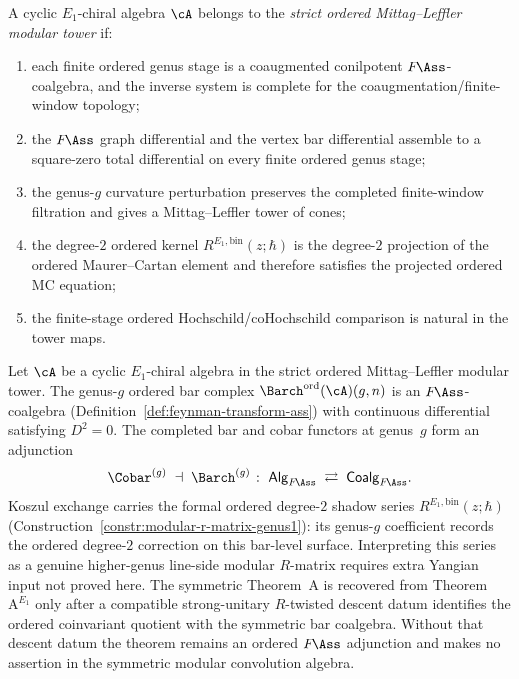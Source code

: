 \begin{definition}
\label{def:strict-ordered-ml-modular-tower}
A cyclic $E_1$-chiral algebra $\cA$ belongs to the
\emph{strict ordered Mittag--Leffler modular tower} if:
\begin{enumerate}[label=\textup{(O\arabic*)}]
\item each finite ordered genus stage is a coaugmented conilpotent
 $F\!\Ass$-coalgebra, and the inverse system is complete for the
 coaugmentation/finite-window topology;
\item the $F\!\Ass$ graph differential and the vertex bar
differential assemble to a square-zero total differential on every
finite ordered genus stage;
\item the genus-$g$ curvature perturbation preserves the completed
finite-window filtration and gives a Mittag--Leffler tower of cones;
\item the degree-$2$ ordered kernel
$R^{E_1,\mathrm{bin}}(z;\hbar)$ is the degree-$2$ projection of the
ordered Maurer--Cartan element and therefore satisfies the projected
ordered MC equation;
\item the finite-stage ordered Hochschild/coHochschild comparison is
natural in the tower maps.
\end{enumerate}
\end{definition}

\begin{theorem}
\label{thm:e1-theorem-A-modular}
Let $\cA$ be a cyclic $E_1$-chiral algebra in the strict ordered
Mittag--Leffler modular tower. The genus-$g$ ordered
bar complex ${\Barch}^{\mathrm{ord}}(\cA)(g,n)$ is an
$F\!\Ass$-coalgebra
\textup{(}Definition~\textup{\ref{def:feynman-transform-ass}})
with continuous differential satisfying $D^2 = 0$.
The completed bar and cobar functors at genus~$g$ form an adjunction
\[
\Cobar^{(g)}
\;\dashv\;
{\Barch}^{(g)}
\;\colon\;
\mathsf{Alg}_{F\!\Ass}
\;\rightleftarrows\;
\mathsf{Coalg}_{F\!\Ass}.
\]
Koszul exchange carries the formal ordered degree-$2$ shadow series
$R^{E_1,\mathrm{bin}}(z;\hbar)$
\textup{(}Construction~\textup{\ref{constr:modular-r-matrix-genus1}}):
its genus-$g$ coefficient records the ordered degree-$2$ correction on
this bar-level surface. Interpreting this series as a genuine
higher-genus line-side modular $R$-matrix requires extra Yangian input
not proved here.
The symmetric Theorem~A is recovered from Theorem~$\mathrm{A}^{E_1}$
only after a compatible strong-unitary $R$-twisted descent datum
identifies the ordered coinvariant quotient with the symmetric bar
coalgebra. Without that descent datum the theorem remains an ordered
$F\!\Ass$ adjunction and makes no assertion in the symmetric modular
convolution algebra.
\end{theorem}

